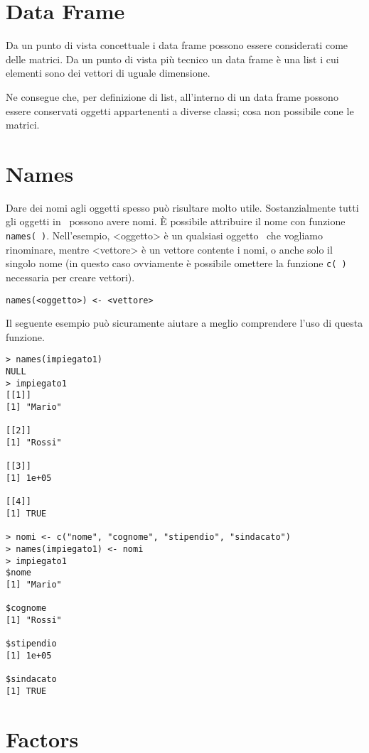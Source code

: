 \section{Data Frame}

Da un punto di vista concettuale i data frame possono essere considerati come delle matrici. Da un punto di vista più tecnico un data frame è una list i cui elementi sono dei vettori di uguale dimensione.

Ne consegue che, per definizione di list, all'interno di un data frame possono essere conservati oggetti appartenenti a diverse classi; cosa non possibile cone le matrici.

\section{Names}

Dare dei nomi agli oggetti spesso può risultare molto utile. Sostanzialmente tutti gli oggetti in \erre\ possono avere nomi. È possibile attribuire il nome con funzione \lstinline!names( )!. Nell'esempio, <oggetto> è un qualsiasi oggetto \erre\ che vogliamo rinominare, mentre <vettore> è un vettore contente i nomi, o anche solo il singolo nome (in questo caso ovviamente è possibile omettere la funzione \lstinline!c( )! necessaria per creare vettori).

\begin{lstlisting}
names(<oggetto>) <- <vettore>
\end{lstlisting}

Il seguente esempio può sicuramente aiutare a meglio comprendere l'uso di questa funzione.

\begin{lstlisting}
> names(impiegato1)
NULL
> impiegato1
[[1]]
[1] "Mario"

[[2]]
[1] "Rossi"

[[3]]
[1] 1e+05

[[4]]
[1] TRUE

> nomi <- c("nome", "cognome", "stipendio", "sindacato")
> names(impiegato1) <- nomi
> impiegato1
$nome
[1] "Mario"

$cognome
[1] "Rossi"

$stipendio
[1] 1e+05

$sindacato
[1] TRUE
\end{lstlisting}

\section{Factors}

